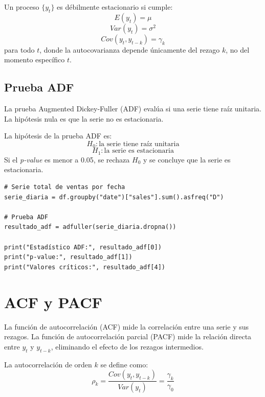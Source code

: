 \documentclass[12pt,a4paper]{article}
\begin{document}
\begin{latexcell}
Un proceso \(\{y_t\}\) es débilmente estacionario si cumple:
\[
E(y_t)=\mu
\]
\[
Var(y_t)=\sigma^2
\]
\[
Cov(y_t,y_{t-k})=\gamma_k
\]
para todo \(t\), donde la autocovarianza depende únicamente del rezago \(k\), no del momento específico \(t\).
\end{latexcell}

\subsection{Prueba ADF}

\begin{markdowncell}
La prueba Augmented Dickey-Fuller (ADF) evalúa si una serie tiene raíz unitaria. La hipótesis nula es que la serie no es estacionaria.
\end{markdowncell}

\begin{latexcell}
La hipótesis de la prueba ADF es:
\[
H_0: \text{la serie tiene raíz unitaria}
\]
\[
H_1: \text{la serie es estacionaria}
\]
Si el \textit{p-value} es menor a 0.05, se rechaza \(H_0\) y se concluye que la serie es estacionaria.
\end{latexcell}

\begin{lstlisting}[style=pythonstyle]
# Serie total de ventas por fecha
serie_diaria = df.groupby("date")["sales"].sum().asfreq("D")

# Prueba ADF
resultado_adf = adfuller(serie_diaria.dropna())

print("Estadístico ADF:", resultado_adf[0])
print("p-value:", resultado_adf[1])
print("Valores críticos:", resultado_adf[4])
\end{lstlisting}

\section{ACF y PACF}

\begin{markdowncell}
La función de autocorrelación (ACF) mide la correlación entre una serie y sus rezagos. La función de autocorrelación parcial (PACF) mide la relación directa entre \(y_t\) y \(y_{t-k}\), eliminando el efecto de los rezagos intermedios.
\end{markdowncell}

\begin{latexcell}
La autocorrelación de orden \(k\) se define como:
\[
\rho_k = \frac{Cov(y_t,y_{t-k})}{Var(y_t)} = \frac{\gamma_k}{\gamma_0}
\]
\end{latexcell}
\end{document}
